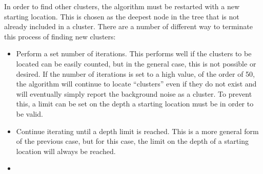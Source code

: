 In order to find other clusters, the algorithm must be restarted with a new
starting location. This is chosen as the deepest node in the tree that is not
already included in a cluster. There are a number of different way to terminate
this process of finding new clusters:

\begin{itemize}

	\item Perform a set number of iterations. This performs well if the
		clusters to be located can be easily counted, but in the general case,
		this is not possible or desired. If the number of iterations is set to
		a high value, of the order of 50, the algorithm will continue to locate
		``clusters'' even if they do not exist and will eventually simply
		report the background noise as a cluster. To prevent this, a limit can
		be set on the depth a starting location must be in order to be valid.

	\item Continue iterating until a depth limit is reached. This is a more
		general form of the previous case, but for this case, the limit on the
		depth of a starting location will always be reached.

	\item

\end{itemize}

